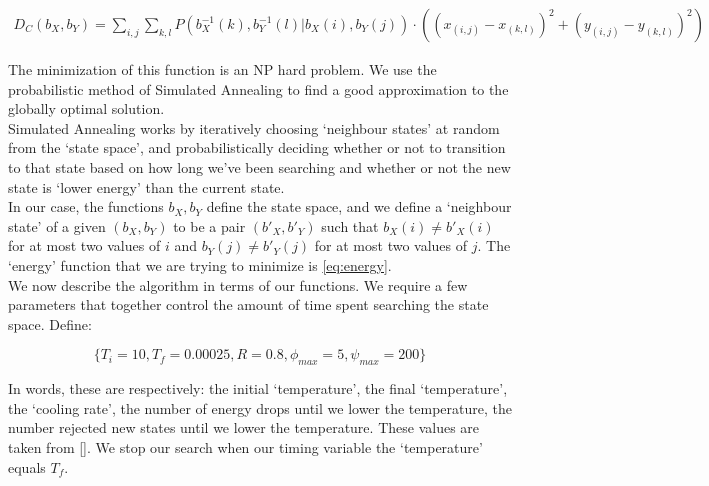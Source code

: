 \begin{align}
    \label{eq:energy}
    D_C(b_X,b_Y)=
        \sum_{i,j}
            \sum_{k,l}
            P(b_X^{-1}(k), b_Y^{-1}(l) | b_X(i), b_Y(j))\cdot
            \left((x_{(i,j)}-x_{(k,l)})^2+(y_{(i,j)}-y_{(k,l)})^2\right)
\end{align}

The minimization of this function is an NP hard problem. We use the probabilistic method of Simulated Annealing to find a good approximation to the globally optimal solution.\\

Simulated Annealing works by iteratively choosing `neighbour states' at random from the `state space', and probabilistically deciding whether or not to transition to that state based on how long we've been searching and whether or not the new state is `lower energy' than the current state.\\

In our case, the functions $b_X,b_Y$ define the state space, and we define a `neighbour state' of a given $(b_X, b_Y)$ to be a pair $(b'_X, b'_Y)$ such that $b_X(i)\neq b'_X(i)$ for at most two values of $i$ and $b_Y(j)\neq b'_Y(j)$ for at most two values of $j$. The `energy' function that we are trying to minimize is \eqref{eq:energy}.\\

We now describe the algorithm in terms of our functions. We require a few parameters that together control the amount of time spent searching the state space. Define:

\begin{equation}
    \{T_i=10,T_f=0.00025,R=0.8,\phi_{max}=5,\psi_{max}=200\}
\end{equation}

In words, these are respectively: the initial `temperature', the final `temperature', the `cooling rate', the number of energy drops until we lower the temperature, the number rejected new states until we lower the temperature. These values are taken from \ref{}. We stop our search when our timing variable the `temperature' equals $T_f$.

